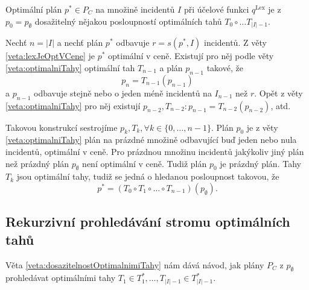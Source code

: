 \begin{veta}\label{veta:dosazitelnostOptimalnimiTahy}
  Optimální plán $p^* \in P_C$ na množině incidentů $I$ při účelové funkci $q^{\text{Lex}}$ je z $p_0 = p_{\emptyset}$
  dosažitelný nějakou posloupností optimálních tahů $T_0 \circ \dots T_{|I|-1}$.
\end{veta}
\begin{dukaz}
  Nechť $n = |I|$ a
  nechť plán $p^*$ odbavuje $r = s(p^*, I)$ incidentů.
  Z věty \ref{veta:lexJeOptVCene} je $p^*$ optimální v ceně.
  Existují pro něj podle věty \ref{veta:optimalniTahy} optimální tah $T_{n-1}$ a plán $p_{n-1}$ takové, že
  \begin{equation*}
    p_n = T_{n-1}(p_{n-1})
  \end{equation*}
  a $p_{n-1}$ odbavuje stejně nebo o jeden méně incidentů na $I_{n-1}$ než $r$.
  Opět z věty \ref{veta:optimalniTahy} pro něj existují $p_{n-2}, T_{n-2} \colon p_{n-1} = T_{n-2}(p_{n-2})$, atd.\

  Takovou konstrukcí sestrojíme $p_{k}, T_{k}, \forall k \in \{ 0, \dots, n-1 \}$. 
  Plán $p_0$ je z věty \ref{veta:optimalniTahy} plán na prázdné množině odbavující buď jeden nebo nula incidentů, optimální v ceně.
  Pro prázdnou množinu incidentů jakýkoliv jiný plán než prázdný plán $p_{\emptyset}$ není optimální v ceně.
  Tudiž plán $p_0$ je prázdný plán.
  Tahy $T_k$ jsou optimální tahy, tudiž se jedná o hledanou posloupnost takovou, že
  \begin{equation*}
    p^* = (T_0 \circ T_1 \circ \dots \circ T_{n-1})(p_{\emptyset}).
  \end{equation*}
\end{dukaz}

\subsection{Rekurzivní prohledávání stromu optimálních tahů}

Věta \ref{veta:dosazitelnostOptimalnimiTahy} nám dává návod, jak plány $P_C$ z $p_{\emptyset}$ prohledávat optimálními tahy $T_1 \in T^*_1, \dots , T_{|I| - 1} \in T^*_{|I|-1}$.

